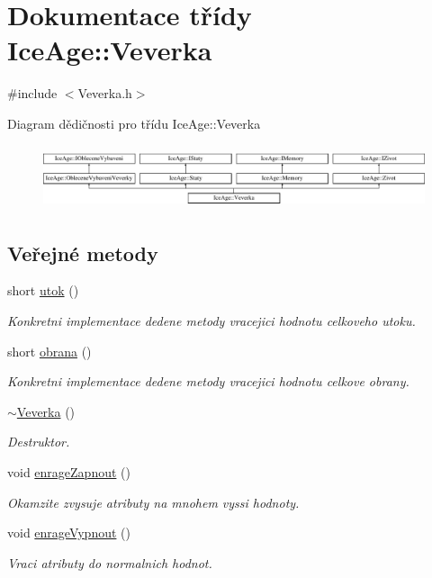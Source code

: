 \hypertarget{classIceAge_1_1Veverka}{}\section{Dokumentace třídy Ice\+Age\+:\+:Veverka}
\label{classIceAge_1_1Veverka}


{\ttfamily \#include $<$Veverka.\+h$>$}

Diagram dědičnosti pro třídu Ice\+Age\+:\+:Veverka\begin{figure}[H]
\begin{center}
\leavevmode
\includegraphics[height=1.883408cm]{d5/d89/classIceAge_1_1Veverka}
\end{center}
\end{figure}
\subsection*{Veřejné metody}
\begin{DoxyCompactItemize}
\item 
short \hyperlink{classIceAge_1_1Veverka_af5b4c4f1efe81d428564352c3257eff4}{utok} ()
\begin{DoxyCompactList}\small\item\em Konkretni implementace dedene metody vracejici hodnotu celkoveho utoku. \end{DoxyCompactList}\item 
short \hyperlink{classIceAge_1_1Veverka_a0de0d0e1bdd72451abe0b6b7eaa74bee}{obrana} ()
\begin{DoxyCompactList}\small\item\em Konkretni implementace dedene metody vracejici hodnotu celkove obrany. \end{DoxyCompactList}\item 
\hyperlink{classIceAge_1_1Veverka_ad58ee98ef7bafb1adf634ba2936f9a6b}{$\sim$\+Veverka} ()
\begin{DoxyCompactList}\small\item\em Destruktor. \end{DoxyCompactList}\item 
void \hyperlink{classIceAge_1_1Veverka_a3b917725872714ac866bc2028bf7d7d9}{enrage\+Zapnout} ()
\begin{DoxyCompactList}\small\item\em Okamzite zvysuje atributy na mnohem vyssi hodnoty. \end{DoxyCompactList}\item 
void \hyperlink{classIceAge_1_1Veverka_a1899ce1f8542829ec12e9087df188be8}{enrage\+Vypnout} ()
\begin{DoxyCompactList}\small\item\em Vraci atributy do normalnich hodnot. \end{DoxyCompactList}\end{DoxyCompactItemize}
